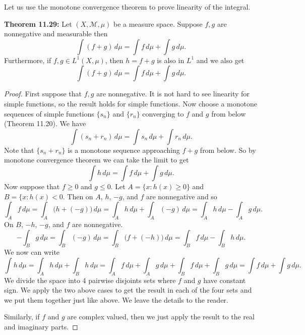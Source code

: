 \documentclass[12pt]{book}
\newcommand{\sM}{{\mathcal{M}}}
\theoremstyle{plain}
\theoremstyle{remark}
\theoremstyle{definition}
\theoremstyle{exercise}
\theoremstyle{example}
\begin{document}
\medskip

Let us use the monotone convergence theorem to prove linearity of
the integral.

\pagebreak[1]
\medskip

\textbf{Theorem 11.29:}
Let $(X,\sM,\mu)$ be a measure space.
Suppose $f, g$ are nonnegative and measurable then
\begin{equation*}
\int (f+g) \, d\mu = \int f \, d\mu + \int g \, d\mu .
\end{equation*}
\nopagebreak[4]
Furthermore, if
$f, g \in L^1(X,\mu)$, then $h = f+g$ is also in $L^1$ and
we also get
\begin{equation*}
\int (f+g) \, d\mu = \int f \, d\mu + \int g \, d\mu .
\end{equation*}

\medskip

\begin{proof}
First suppose that $f, g$ are nonnegative.  It is not hard to see linearity
for simple functions, so the result holds for simple functions.  Now
choose a monotone sequences of simple functions $\{ s_n \}$ and $\{ r_n \}$
converging to $f$ and $g$ from below (Theorem 11.20).
We have
$$
\int (s_n+r_n) \, d\mu = 
\int s_n \, d\mu +
\int r_n \, d\mu .
$$
Note that $\{s_n + r_n\}$ is a monotone sequence approaching $f+g$ from
below.  So by monotone convergence theorem we can take the limit to get
$$
\int h \, d\mu = 
\int f \, d\mu +
\int g \, d\mu .
$$
Now suppose that $f \geq 0$ and $g \leq 0$.  Let $A = \{ x : h(x) \geq 0 \}$
and $B = \{ x : h(x) < 0$.  Then on $A$, $h$, $-g$, and $f$ are nonnegative
and so
$$
\int_A f \, d\mu =
\int_A \bigl(h+(-g)\bigr) \, d\mu = 
\int_A h \, d\mu +
\int_A (-g) \, d\mu = 
\int_A h \, d\mu -
\int_A g \, d\mu .
$$
On $B$, $-h$, $-g$, and $f$ are nonnegative.
$$
- \int_B g \, d\mu =
\int_B (-g) \, d\mu =
\int_B \bigl(f+(-h)\bigr) \, d\mu =
\int_B f \, d\mu -
\int_B h \, d\mu .
$$
We now can write
\begin{equation*}
\int h\, d\mu = 
\int_A h\, d\mu 
+
\int_B h\, d\mu = 
\int_A f\, d\mu 
+
\int_A g\, d\mu 
+
\int_B f\, d\mu 
+
\int_B g\, d\mu 
=
\int f\, d\mu 
+
\int g\, d\mu  .
\end{equation*}
We divide the space into 4 pairwise disjoints sets where $f$ and $g$
have constant sign.  We apply the two above cases to get the result
in each of the four sets and we put them together just like above.
We leave the details to the reader.

Similarly, if $f$ and $g$ are complex valued, then we just apply the result to
the real and imaginary parts.
\end{proof}
\end{document}
